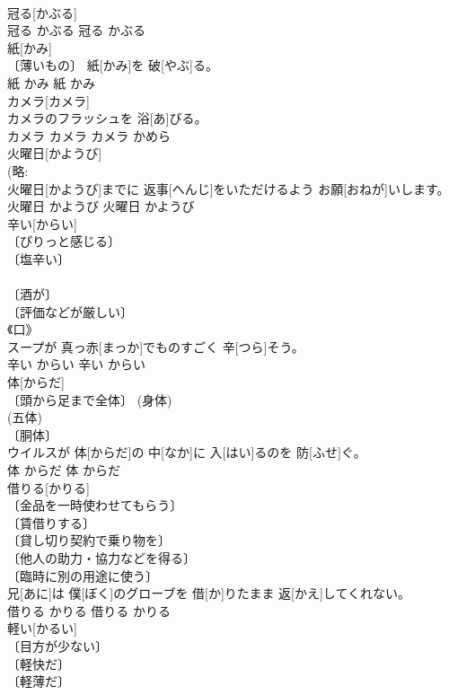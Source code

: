 \documentclass[8pt]{extreport}
\begin{document}
\begin{CJK}{UTF8}{min}
\\	冠る[かぶる]	
\\	冠る	かぶる	冠る	かぶる	
\\	紙[かみ]	
\\	〔薄いもの〕	紙[かみ]を 破[やぶ]る。	
\\	紙	かみ	紙	かみ	
\\	カメラ[カメラ]	
\\	カメラのフラッシュを 浴[あ]びる。	
\\	カメラ	カメラ	カメラ	かめら	
\\	火曜日[かようび]	
\\	(略: 
\\	火曜日[かようび]までに 返事[へんじ]をいただけるよう お願[おねが]いします。	
\\	火曜日	かようび	火曜日	かようび	
\\	辛い[からい]	
\\	〔ぴりっと感じる〕 
\\	〔塩辛い〕 
\\	[＝しおからい] 
\\	〔酒が〕 
\\	〔評価などが厳しい〕 
\\	《口》 
\\	スープが 真っ赤[まっか]でものすごく 辛[つら]そう。	
\\	辛い	からい	辛い	からい	
\\	体[からだ]	
\\	〔頭から足まで全体〕 (身体) 
\\	(五体) 
\\	〔胴体〕 
\\	ウイルスが 体[からだ]の 中[なか]に 入[はい]るのを 防[ふせ]ぐ。	
\\	体	からだ	体	からだ	
\\	借りる[かりる]	
\\	〔金品を一時使わせてもらう〕 
\\	〔賃借りする〕 
\\	〔貸し切り契約で乗り物を〕 
\\	〔他人の助力・協力などを得る〕 
\\	〔臨時に別の用途に使う〕 
\\	兄[あに]は 僕[ぼく]のグローブを 借[か]りたまま 返[かえ]してくれない。	
\\	借りる	かりる	借りる	かりる	
\\	軽い[かるい]	
\\	〔目方が少ない〕 
\\	〔軽快だ〕 
\\	〔軽薄だ〕 

\end{CJK}
\end{document}

